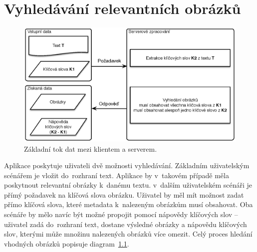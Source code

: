 \chapter{Vyhledávání relevantních obrázků}
\label{chap:teorie}





\begin{figure}[h]
  \centering
  \includegraphics[width=150mm]{dataflow.eps}
  \caption{Základní tok dat mezi klientem a serverem.}
  \label{fig:dataflow}
\end{figure}


Aplikace poskytuje uživateli dvě možnosti vyhledávání. Základním uživatelským scénářem je vložit do~rozhraní text. Aplikace by v~takovém případě měla poskytnout relevantní obrázky k~danému textu. v~dalším uživatelském scénáři je přímý požadavek na klíčová slova obrázku. Uživatel by měl mít možnost zadat přímo klíčová slova, které metadata k~nalezeným obrázkům musí obsahovat. Oba scénáře by mělo navíc být možné propojit pomocí nápovědy klíčových slov -- uživatel zadá do~rozhraní text, dostane výsledné obrázky a nápovědu klíčových slov, kterými může množinu nalezených obrázků více omezit. Celý proces hledání vhodných obrázků popisuje diagram~\ref{fig:dataflow}.

